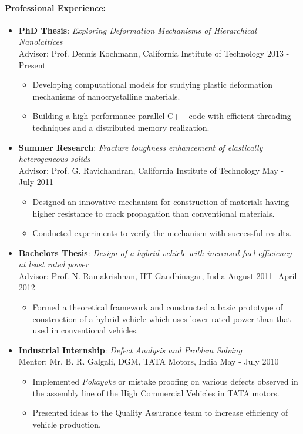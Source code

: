 \documentclass[10pt,fleqn]{article}
\begin{document}
\paragraph*{Professional Experience:}
\vspace{-10pt}
\begin{itemize}
\setlength{\itemsep}{8pt}
\setlength{\parskip}{0pt}
\item[] \textbf{PhD Thesis}: \emph{Exploring Deformation Mechanisms of Hierarchical Nanolattices} \\
		 Advisor: Prof. Dennis Kochmann, California Institute of Technology \hfill 2013 - Present 
		  \begin{itemize}
		  \item Developing computational models for studying plastic deformation mechanisms of nanocrystalline materials.
		  \item Building a high-performance parallel C++ code with efficient threading techniques and a distributed memory realization. 
 		  \end{itemize}
\item[] \textbf{Summer Research}: \emph{Fracture toughness enhancement of elastically heterogeneous solids} \\
		  Advisor: Prof. G. Ravichandran, California Institute of Technology \hfill May - July 2011
		   \begin{itemize}
			\item Designed an innovative mechanism for construction of materials having higher resistance to crack propagation than conventional materials.
			\item Conducted experiments to verify the mechanism with successful results.
 			\end{itemize}
\item[] \textbf{Bachelors Thesis}: \emph{Design of a hybrid vehicle with increased fuel efficiency at least rated power}\\		
		  Advisor: Prof. N. Ramakrishnan, IIT Gandhinagar, India \hfill August 2011- April 2012
		   \begin{itemize}
			\item Formed a theoretical framework and constructed a basic prototype of construction of a hybrid vehicle which uses lower rated power than that used in conventional vehicles.
 			\end{itemize} 
\item[] \textbf{Industrial Internship}: \emph{Defect Analysis and Problem Solving} \\
		 Mentor: Mr. B. R. Galgali, DGM, TATA Motors, India \hfill May - July 2010
		    \begin{itemize}
			\item Implemented \emph{Pokayoke} or mistake proofing on various defects observed in the assembly line of the High Commercial Vehicles in TATA motors.
			\item Presented ideas to the Quality Assurance team to increase efficiency of vehicle production.
 			\end{itemize} 			
\end{itemize}
\vspace{-10pt}
\end{document}
